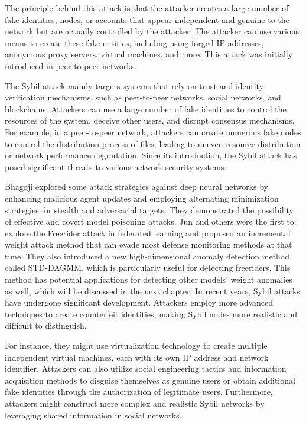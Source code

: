 \documentclass[conference]{IEEEtran}
\begin{document}
The principle behind this attack is that the attacker creates a large number of fake identities, nodes,
or accounts that appear independent and genuine to the network but are actually controlled by the attacker.
The attacker can use various means to create these fake entities, including using forged IP addresses, anonymous proxy servers, virtual machines, and more.
This attack was initially introduced in peer-to-peer networks.

The Sybil attack mainly targets systems that rely on trust and identity verification mechanisms, such as peer-to-peer networks, social networks, and blockchains. Attackers can use a large number of fake identities to control the resources of the system, deceive other users, and disrupt consensus mechanisms. For example, in a peer-to-peer network, attackers can create numerous fake nodes to control the distribution process of files, leading to uneven resource distribution or network performance degradation.
Since its introduction, the Sybil attack has posed significant threats to various network security systems.

Bhagoji \cite{b111} explored some attack strategies against deep neural networks by enhancing malicious agent
updates and employing alternating minimization strategies for stealth and adversarial targets. They demonstrated
the possibility of effective and covert model poisoning attacks. Jun \cite{b112} and others were the first to explore the Freerider attack in federated learning and proposed an incremental weight attack method that can evade most defense monitoring methods at that time. They also introduced a new high-dimensional anomaly detection method called STD-DAGMM, which is particularly useful for detecting freeriders. This method has potential applications for detecting other models' weight anomalies as well, which will be discussed in the next chapter.
In recent years, Sybil attacks have undergone significant development.
Attackers employ more advanced techniques to create counterfeit identities, making Sybil nodes more realistic and difficult to distinguish.

For instance, they might use virtualization technology to create multiple independent virtual machines,
each with its own IP address and network identifier. Attackers can also utilize social engineering tactics and information acquisition methods
to disguise themselves as genuine users or obtain additional fake identities through the authorization of legitimate users.
Furthermore, attackers might construct more complex and realistic Sybil networks by leveraging shared information in social networks.
\end{document}
